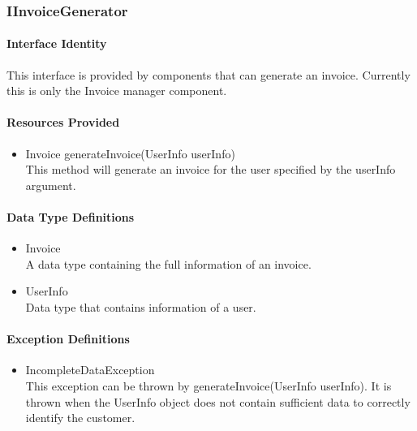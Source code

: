 \subsubsection{IInvoiceGenerator}
\paragraph{Interface Identity}
This interface is provided by components that can generate an invoice. Currently
	this is only the Invoice manager component.
\paragraph{Resources Provided}
\begin{itemize}
	\item{Invoice generateInvoice(UserInfo userInfo)}\\
	This method will generate an invoice for the user specified by the
		userInfo argument.
\end{itemize}
\paragraph{Data Type Definitions}
\begin{itemize}
	\item Invoice\\
	A data type containing the full information of an invoice.
	\item UserInfo\\
	Data type that contains information of a user.
\end{itemize}
\paragraph{Exception Definitions}
\begin{itemize}
	\item IncompleteDataException\\
	This exception can be thrown by generateInvoice(UserInfo userInfo). It is thrown
		when the UserInfo object does not contain sufficient data to correctly identify
		the customer.
\end{itemize}